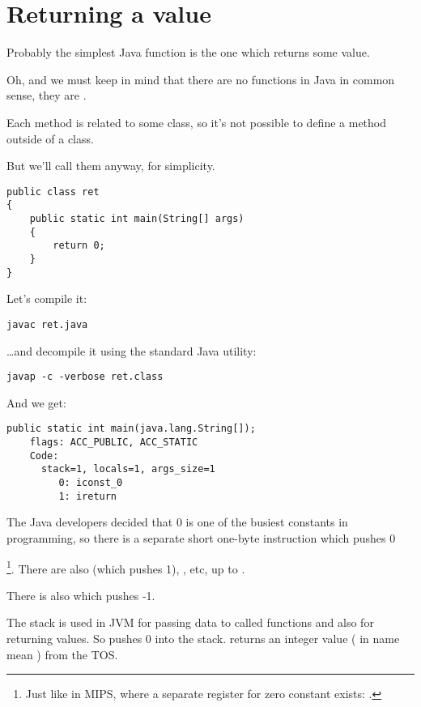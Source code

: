 \section{Returning a value}

Probably the simplest Java function is the one which returns some value.

Oh, and we must keep in mind that there are no  functions in Java in common sense,
they are . 

Each method is related to some class, so it's not possible to define
a method outside of a class.

But we'll call them  anyway, for simplicity.

\begin{lstlisting}
public class ret
{
	public static int main(String[] args) 
	{
		return 0;
	}
}
\end{lstlisting}

Let's compile it:

\begin{lstlisting}
javac ret.java
\end{lstlisting}

\dots and decompile it using the standard Java utility:

\begin{lstlisting}
javap -c -verbose ret.class
\end{lstlisting}

And we get:

\begin{lstlisting}[caption=JDK 1.7 (excerpt)]
  public static int main(java.lang.String[]);
    flags: ACC_PUBLIC, ACC_STATIC
    Code:
      stack=1, locals=1, args_size=1
         0: iconst_0      
         1: ireturn       
\end{lstlisting}

The Java developers decided that 0 is one of the busiest constants in programming, 
so there is a separate short one-byte  instruction which pushes 0

\footnote{Just like in MIPS, where a separate register for zero constant exists: .}.
There are also  (which pushes 1), , etc, up to .

There is also  which pushes -1.

The stack is used in JVM for passing data to called functions and also for returning values.
So  pushes 0 into the stack.
 returns an integer value ( in name mean ) from the \ac{TOS}.

